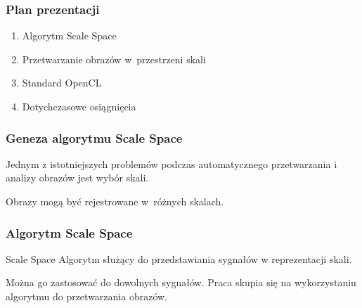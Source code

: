 

\begin{frame}
\frametitle{Plan prezentacji}

\begin{enumerate}
\item Algorytm Scale Space
\item Przetwarzanie obrazów w~przestrzeni skali
\item Standard OpenCL
\item Dotychczasowe osiągnięcia
\end{enumerate}

\end{frame}


\begin{frame}
\frametitle{Geneza algorytmu Scale Space}

Jednym z istotniejszych problemów podczas automatycznego przetwarzania i analizy obrazów jest wybór skali.

Obrazy mogą być rejestrowane w~różnych skalach.

\end{frame}

\begin{frame}
\frametitle{Algorytm Scale Space}
\begin{block}{Scale Space}
Algorytm służący do przedstawiania sygnałów w reprezentacji skali.
\end{block}
Można go zastosować do dowolnych sygnałów. Praca skupia się na wykorzystaniu algorytmu do przetwarzania obrazów.

\end{frame}


